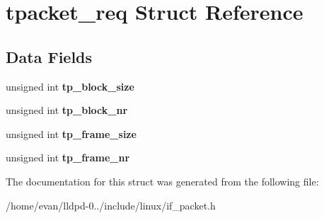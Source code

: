 \section{tpacket\-\_\-req \-Struct \-Reference}
\label{structtpacket__req}
\subsection*{\-Data \-Fields}
\begin{DoxyCompactItemize}
\item 
unsigned int {\bfseries tp\-\_\-block\-\_\-size}\label{structtpacket__req_a217e9dd8067a2fd5245a08ae93c6499a}

\item 
unsigned int {\bfseries tp\-\_\-block\-\_\-nr}\label{structtpacket__req_a665aad782885db025da04d47eb661207}

\item 
unsigned int {\bfseries tp\-\_\-frame\-\_\-size}\label{structtpacket__req_af58766f0b8818250a2e9de278f523f1e}

\item 
unsigned int {\bfseries tp\-\_\-frame\-\_\-nr}\label{structtpacket__req_a152d5525af0df60e838039fbb3ab119d}

\end{DoxyCompactItemize}


\-The documentation for this struct was generated from the following file\-:\begin{DoxyCompactItemize}
\item 
/home/evan/lldpd-\/0../include/linux/if\-\_\-packet.\-h\end{DoxyCompactItemize}
